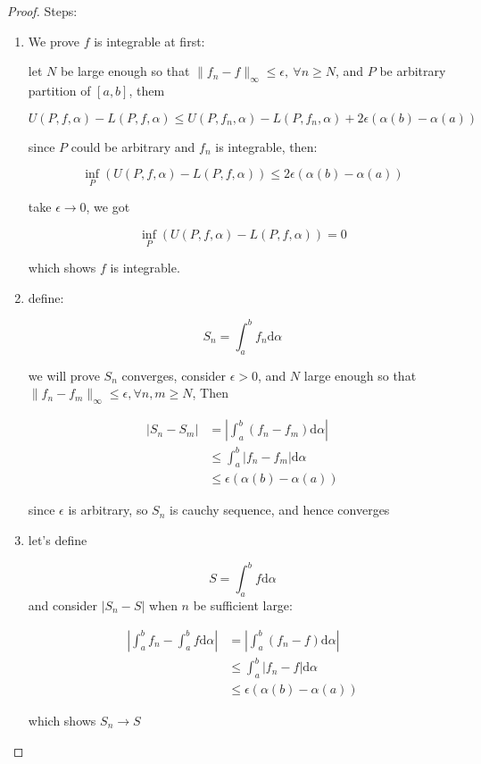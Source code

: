 \begin{proof}
    Steps:

    \begin{enumerate}
        \item  We prove $f$ is integrable at first:

    let $N$ be large enough so that $\| f_n - f \|_\infty \le \epsilon, \: \forall n \ge N$, and $P$ be 
    arbitrary partition of $[a,b]$, them

    \[
        U(P,f,\alpha) - L(P,f,\alpha) \le U(P, f_n, \alpha) - L(P,f_n,\alpha) + 2\epsilon(\alpha(b) - \alpha(a))
    \]

    since $P$ could be arbitrary and $f_n$ is integrable, then:


    \[
        \inf_{P}\left(U(P,f,\alpha) - L(P,f,\alpha) \right) \le   2\epsilon(\alpha(b) - \alpha(a))
    \]

    take $\epsilon \to 0$, we got

    \[
        \inf_{P}\left(U(P,f,\alpha) - L(P,f,\alpha) \right) = 0
    \]

    which shows $f$ is integrable.

        \item define:

        \[
            S_n = \int_a^b f_n \mathrm{d} \alpha
        \]

        we will prove $S_n$ converges, consider $\epsilon > 0$, and $N$ large enough so that 
        $\| f_n - f_m\|_\infty \le \epsilon, \forall n,m \ge N$, Then

        \begin{align*}
            \left| S_n - S_m\right| &= \left| \int_a^b \left(f_n - f_m\right) \mathrm{d} \alpha\right| \\
            & \le \int_a^b \left|f_n - f_m\right| \mathrm{d} \alpha \\
            & \le  \epsilon(\alpha(b) - \alpha(a))
        \end{align*}

        since $\epsilon$ is arbitrary, so $S_n$ is cauchy sequence, and hence converges

    \item let's define

    \[
        S = \int_a^b f \mathrm{d} \alpha
    \]
    and consider $\left| S_n - S\right|$ when $n$ be sufficient large:

    \begin{align*}
        \left|\int_a^b f_n  - \int_a^b f \mathrm{d} \alpha \right| & = \left|\int_a^b \left(f_n - f\right) \mathrm{d} \alpha \right| \\
        & \le  \int_a^b \left|f_n - f\right| \mathrm{d} \alpha \\
        & \le \epsilon(\alpha(b) - \alpha(a))
    \end{align*}
        
    which shows $S_n \to S$
    \end{enumerate}

\end{proof}

